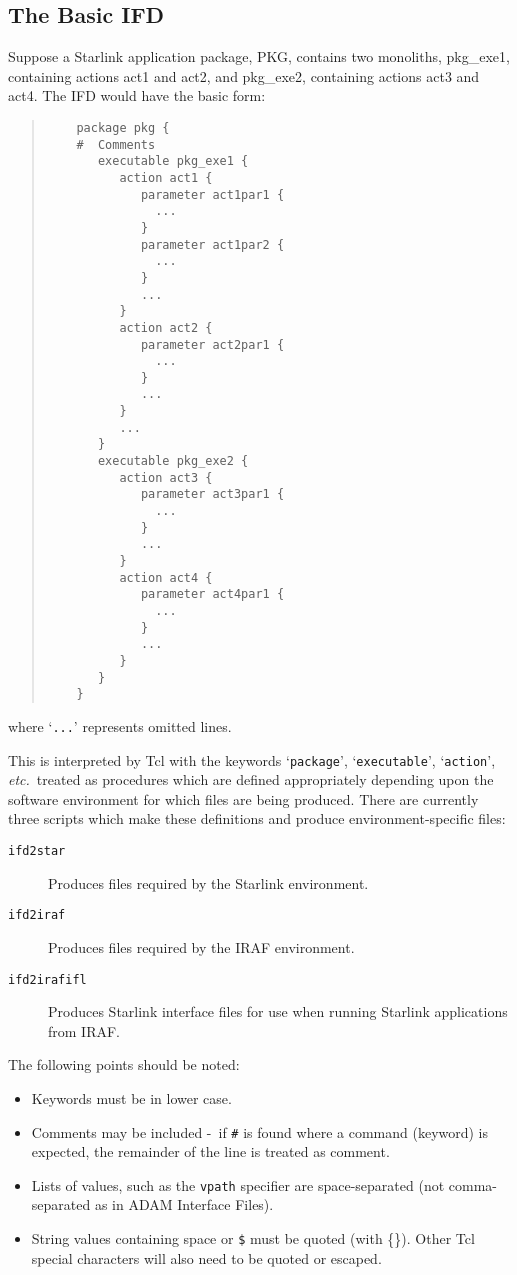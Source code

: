 \documentclass[twoside,11pt]{article}
\newcommand{\htmladdnormallink}[2]{#1}
\newcommand{\htmlref}[2]{#1}
\newcommand{\xlabel}[1]{}
\newcommand{\TCLURL}{http://sunscript.sun.com/tcltext.html}
\newcommand{\dash}{--}
\renewcommand{\dash}{-}
\begin{document}
\subsection{\xlabel{the_basic_ifd}The Basic IFD}
Suppose a Starlink application package, PKG, contains two monoliths,
pkg\_exe1, containing actions act1 and act2, and pkg\_exe2, containing actions
act3 and act4. The IFD would have the basic form:
\begin{quote} \begin{verbatim}
    package pkg {
    #  Comments
       executable pkg_exe1 {
          action act1 {
             parameter act1par1 {
               ...
             }
             parameter act1par2 {
               ...
             }
             ...
          }
          action act2 {
             parameter act2par1 {
               ...
             }
             ...
          }
          ...
       }
       executable pkg_exe2 {
          action act3 {
             parameter act3par1 {
               ...
             }
             ...
          }
          action act4 {
             parameter act4par1 {
               ...
             }
             ...
          }
       }
    }
\end{verbatim} \end{quote}
where `\texttt{...}' represents omitted lines.

This is interpreted by
\htmladdnormallink{Tcl}{\TCLURL}
with the keywords `\texttt{package}', `\texttt{executable}', `\texttt{action}', 
\textit{etc.}\ treated as procedures which are defined appropriately depending
upon the software environment for which files are being produced. 
There are currently three scripts which make these definitions and produce
environment-specific files:
\begin{description}
\item[\htmlref{\texttt{ifd2star}}{ifd2star}] Produces files required by the 
Starlink environment.
\item[\htmlref{\texttt{ifd2iraf}}{ifd2iraf}] Produces files required by the 
IRAF environment.
\item[\htmlref{\texttt{ifd2irafifl}}{ifd2irafifl}] Produces Starlink interface 
files for use when running Starlink applications from IRAF.
\end{description}

The following points should be noted:
\begin{itemize}
\item Keywords must be in lower case.
\item Comments may be included \dash\ if \texttt{\#} is found where a command 
(keyword) is expected, the remainder of the line is treated as comment.
\item Lists of values, such as the
\htmlref{\texttt{vpath}}{vpath} specifier are space-separated (not 
comma-separated as in ADAM Interface Files).
\item String values containing space or \texttt{\$} must be quoted (with 
\{\}).
Other Tcl special characters will also need to be quoted or escaped.
\end{itemize}
\end{document}
